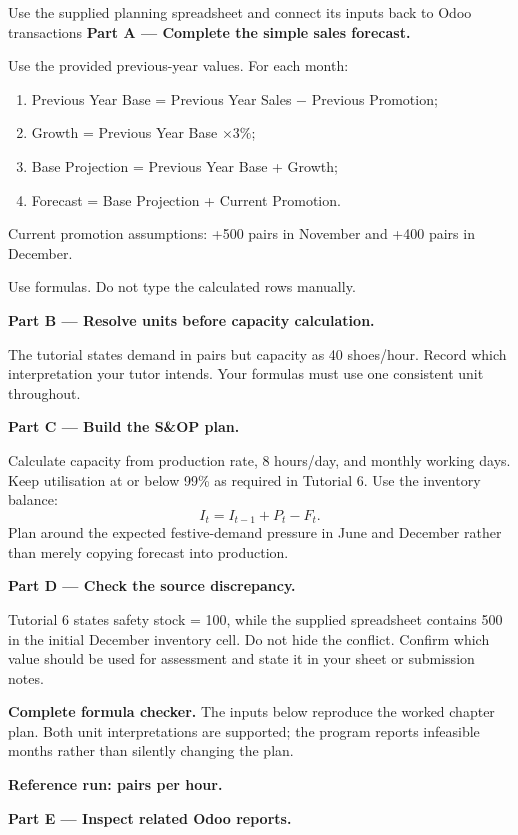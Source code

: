\begin{labproject}{Use the supplied planning spreadsheet and connect its inputs back to Odoo transactions}
\medskip\noindent\textbf{Part A --- Complete the simple sales forecast.}

Use the provided previous-year values. For each month:
\begin{enumerate}
  \item Previous Year Base = Previous Year Sales $-$ Previous Promotion;
  \item Growth = Previous Year Base $\times 3\%$;
  \item Base Projection = Previous Year Base + Growth;
  \item Forecast = Base Projection + Current Promotion.
\end{enumerate}

Current promotion assumptions: +500 pairs in November and +400 pairs in December.

Use formulas. Do not type the calculated rows manually.

\medskip\noindent\textbf{Part B --- Resolve units before capacity calculation.}

The tutorial states demand in pairs but capacity as 40 shoes/hour. Record which interpretation your tutor intends. Your formulas must use one consistent unit throughout.

\medskip\noindent\textbf{Part C --- Build the S\&OP plan.}

Calculate capacity from production rate, 8 hours/day, and monthly working days. Keep utilisation at or below 99\% as required in Tutorial 6. Use the inventory balance:
\[
I_t=I_{t-1}+P_t-F_t.
\]
Plan around the expected festive-demand pressure in June and December rather than merely copying forecast into production.

\medskip\noindent\textbf{Part D --- Check the source discrepancy.}

Tutorial 6 states safety stock = 100, while the supplied spreadsheet contains 500 in the initial December inventory cell. Do not hide the conflict. Confirm which value should be used for assessment and state it in your sheet or submission notes.


\textbf{Complete formula checker.} The inputs below reproduce the worked chapter plan. Both unit interpretations are supported; the program reports infeasible months rather than silently changing the plan.


\textbf{Reference run: pairs per hour.}

\medskip\noindent\textbf{Part E --- Inspect related Odoo reports.}


\end{labproject}
